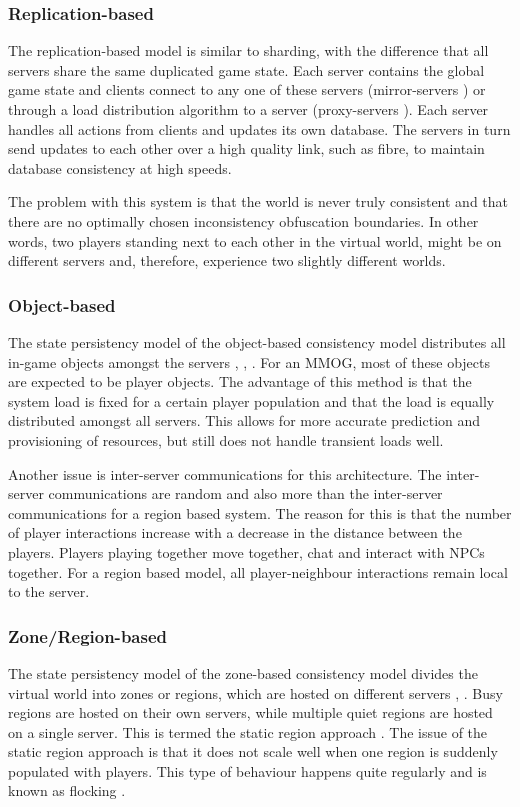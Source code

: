\documentclass[10pt,a4paper,journal,cspaper,compsoc]{IEEEtran}
\begin{document}
\subsubsection{Replication-based}
The replication-based model is similar to sharding, with the difference that all servers share the same duplicated game state. Each server contains
the global game state and clients connect to any one of these servers (mirror-servers \cite{mirrored_server}) or through a load distribution
algorithm to a server (proxy-servers \cite{proxy_server_dist}). Each server handles all actions from clients and updates its own database. The
servers in turn send updates to each other over a high quality link, such as fibre, to maintain database consistency at high speeds.

The problem with this system is that the world is never truly consistent and that there are no optimally chosen inconsistency obfuscation boundaries.
In other words, two players standing next to each other in the virtual world, might be on different servers and, therefore, experience two slightly
different worlds.

\subsubsection{Object-based}
The state persistency model of the object-based consistency model distributes all in-game objects amongst the servers
\cite{object_based_consistency1}, \cite{object_based_consistency2}, \cite{object_based_consistency3}. For an MMOG, most of these objects are expected
to be player objects. The advantage of this method is that the system load is fixed for a certain player population and that the load is equally
distributed amongst all servers. This allows for more accurate prediction and provisioning of resources, but still does not handle transient loads
well.

Another issue is inter-server communications for this architecture. The inter-server communications are random and also more than the inter-server
communications for a region based system. The reason for this is that the number of player interactions increase with a decrease in the distance
between the players. Players playing together move together, chat and interact with NPCs together. For a region based model, all player-neighbour
interactions remain local to the server.

\subsubsection{Zone/Region-based}
The state persistency model of the zone-based consistency model divides the virtual world into zones or regions, which are hosted on different
servers \cite{zone_based_stat}, \cite{zone_based_dyn}. Busy regions are hosted on their own servers, while multiple quiet regions are hosted on a
single server. This is termed the static region approach \cite{zone_based_stat}. The issue of the static region approach is that it does not scale
well when one region is suddenly populated with players. This type of behaviour happens quite regularly and is known as flocking \cite{flocking}.
\end{document}
